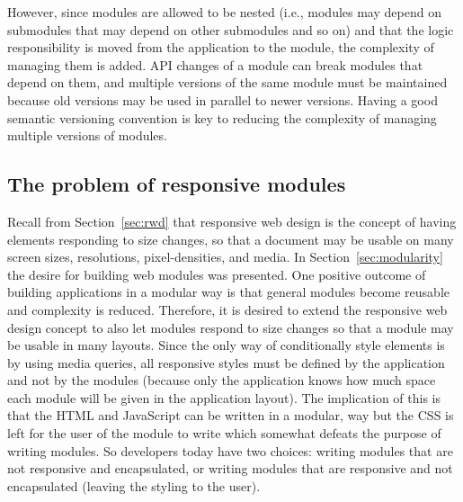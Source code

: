 \documentclass[a4paper,11pt]{kth-mag}
\begin{document}
        However, since modules are allowed to be nested (i.e., modules may depend on submodules that may depend on other submodules and so on) and that the logic responsibility is moved from the application to the module, the complexity of managing them is added.
        \gls{API} changes of a module can break modules that depend on them, and multiple versions of the same module must be maintained because old versions may be used in parallel to newer versions.
        Having a good semantic versioning convention is key to reducing the complexity of managing multiple versions of modules.

      \subsection{The problem of responsive modules}\label{sec:rwd-modular-problem}
        Recall from Section~\ref{sec:rwd} that \gls{responsive} \gls{web} design is the concept of having \glspl{element} responding to size changes, so that a \gls{document} may be usable on many screen sizes, resolutions, pixel-densities, and media.
        In Section~\ref{sec:modularity} the desire for building \gls{web} modules was presented.
        One positive outcome of building applications in a modular way is that general modules become reusable and complexity is reduced.
        Therefore, it is desired to extend the \gls{responsive} \gls{web} design concept to also let modules respond to size changes so that a module may be usable in many layouts.
        Since the only way of conditionally style \glspl{element} is by using \gls{media queries}, all \gls{responsive} styles must be defined by the application and not by the modules (because only the application knows how much space each module will be given in the application layout).
        The implication of this is that the \gls{HTML} and \gls{JavaScript} can be written in a modular, way but the \gls{CSS} is left for the user of the module to write which somewhat defeats the purpose of writing modules.
        So developers today have two choices: writing modules that are not \gls{responsive} and \gls{encapsulated}, or writing modules that are \gls{responsive} and not \gls{encapsulated} (leaving the styling to the user).        
\end{document}

